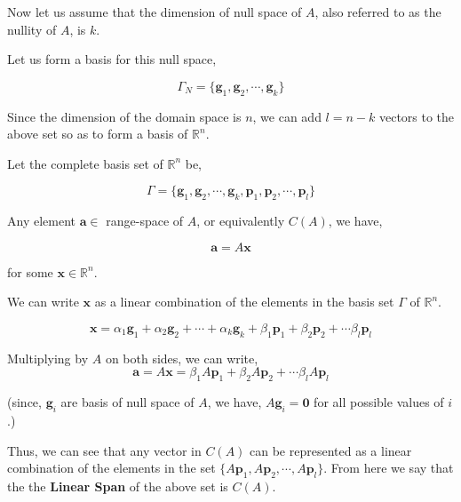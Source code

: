 \documentclass[a4paper]{article}
\begin{document}
Now let us assume that the dimension of null space of $A$, also referred to as the nullity of $A$, is $k$.

Let us form a basis for this null space,

\begin{equation}
\mathit{\Gamma}_N = \{ \boldsymbol{g}_1, \boldsymbol{g}_2, \cdots, \boldsymbol{g}_k \} 
\end{equation}

Since the dimension of the domain space is $n$, we can add $l=n-k$ vectors to the above set so as to form a basis of $\mathbb{R}^{n}$.

Let the complete basis set of $\mathbb{R}^n$ be,

\begin{equation}
\mathit{\Gamma} = \{ \boldsymbol{g}_1, \boldsymbol{g}_2, \cdots, \boldsymbol{g}_k, \boldsymbol{p}_1, \boldsymbol{p}_2, \cdots, \boldsymbol{p}_l \} 
\end{equation}

Any element $\boldsymbol{a} \in$ range-space of $A$, or equivalently $C(A)$, we have,

\begin{equation}
\boldsymbol{a} = A\boldsymbol{x}
\end{equation}

for some $\boldsymbol{x} \in \mathbb{R}^n$.

We can write $\boldsymbol{x}$ as a linear combination of the elements in the basis set $\Gamma$ of $\mathbb{R}^n$.

\begin{equation}
\boldsymbol{x} = \alpha_1 \boldsymbol{g}_1 + \alpha_2 \boldsymbol{g}_2+ \cdots + \alpha_k \boldsymbol{g}_k + \beta_1 \boldsymbol{p}_1 + \beta_2 \boldsymbol{p}_2 + \cdots \beta_l \boldsymbol{p}_l 
\end{equation}

Multiplying by $A$ on both sides, we can write,
\begin{equation}
\boldsymbol{a} = A\boldsymbol{x} = \beta_1 A\boldsymbol{p}_1 + \beta_2 A\boldsymbol{p}_2 + \cdots \beta_l A\boldsymbol{p}_l 
\end{equation}

(since, $\boldsymbol{g}_i$ are basis of null space of $A$, we have, $A\boldsymbol{g}_i = \boldsymbol{0}$ for all possible values of $i$.)

Thus, we can see that any vector in $C(A)$ can be represented as a linear combination of the elements in the set $\{A\boldsymbol{p}_1, A\boldsymbol{p}_2, \cdots, A\boldsymbol{p}_l \}$. From here we say that the the \textbf{Linear Span} of the above set is $C(A)$.
\end{document}
